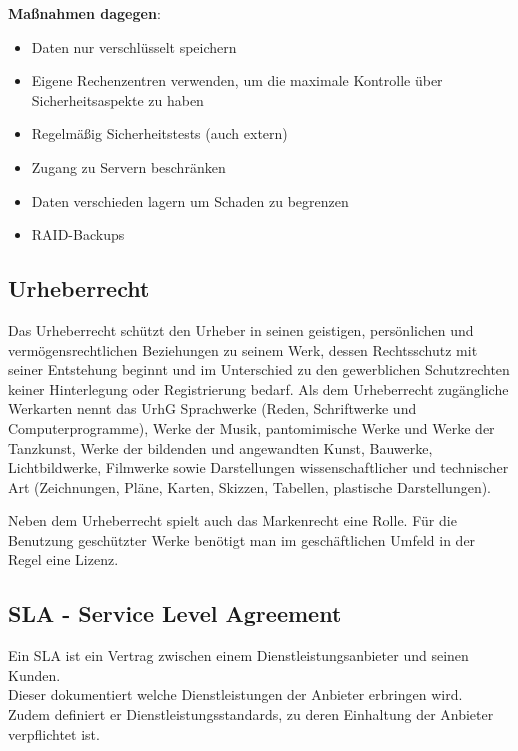 \documentclass[asp1.tex]{subfiles}
\begin{document}
\textbf{Maßnahmen dagegen}:
\begin{itemize}
    \item Daten nur verschlüsselt speichern
    \item Eigene Rechenzentren verwenden, um die maximale Kontrolle über Sicherheitsaspekte zu haben
    \item Regelmäßig Sicherheitstests (auch extern)
    \item Zugang zu Servern beschränken
    \item Daten verschieden lagern um Schaden zu begrenzen
    \item RAID-Backups
\end{itemize}
\vspace{1cm}

\subsection{Urheberrecht}

Das Urheberrecht schützt den Urheber in seinen geistigen, persönlichen und vermögensrechtlichen Beziehungen zu seinem Werk, dessen Rechtsschutz mit seiner Entstehung beginnt und im Unterschied zu den gewerblichen Schutzrechten keiner Hinterlegung oder Registrierung bedarf. Als dem Urheberrecht zugängliche Werkarten nennt das UrhG Sprachwerke (Reden, Schriftwerke und Computerprogramme), Werke der Musik, pantomimische Werke und Werke der Tanzkunst, Werke der bildenden und angewandten Kunst, Bauwerke, Lichtbildwerke, Filmwerke sowie Darstellungen wissenschaftlicher und technischer Art (Zeichnungen, Pläne, Karten, Skizzen, Tabellen, plastische Darstellungen).

Neben dem Urheberrecht spielt auch das Markenrecht eine Rolle. Für die Benutzung geschützter Werke benötigt man im geschäftlichen Umfeld in der Regel eine Lizenz.

\subsection{SLA - Service Level Agreement}

Ein SLA ist ein Vertrag zwischen einem Dienstleistungsanbieter und seinen Kunden. \\
Dieser dokumentiert welche Dienstleistungen der Anbieter erbringen wird. \\
Zudem definiert er Dienstleistungsstandards, zu deren Einhaltung der Anbieter verpflichtet ist.
\end{document}
